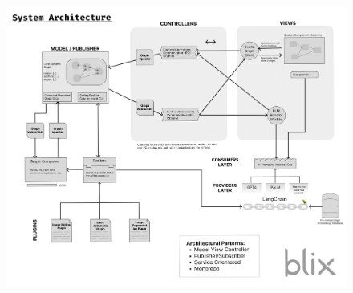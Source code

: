 \documentclass[11pt,a4paper]{article}
\begin{document}
\begin{figure}[ht]
	\centering
	\includegraphics[width=1\textwidth,height=\textheight,keepaspectratio,rotate=0,origin=c]{../diagramPng/SystemArchitecture.png}
\end{figure}
\end{document}

